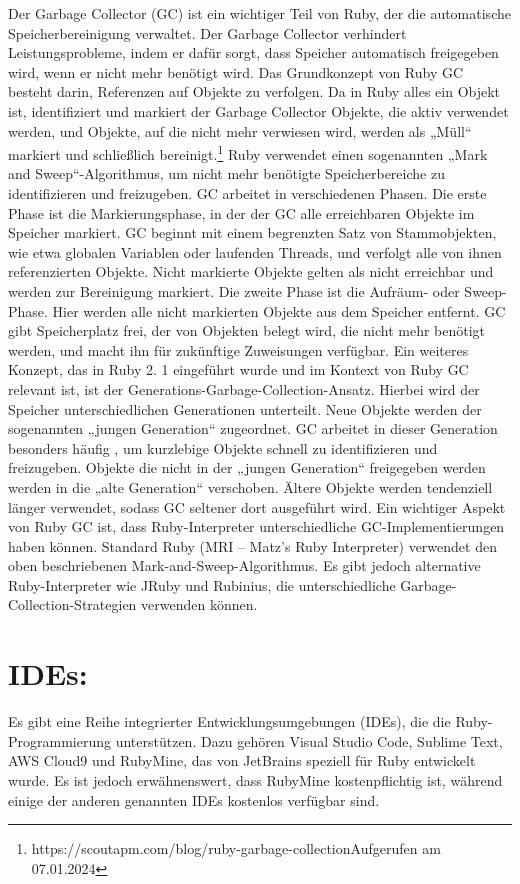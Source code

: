 \documentclass{article}
\begin{document}
Der Garbage Collector (GC) ist ein wichtiger Teil von Ruby, der die automatische Speicherbereinigung verwaltet.
Der Garbage Collector verhindert Leistungsprobleme, indem er dafür sorgt, dass Speicher automatisch freigegeben wird, wenn er nicht mehr benötigt wird.
Das Grundkonzept von Ruby GC besteht darin, Referenzen auf Objekte zu verfolgen.
Da in Ruby alles ein Objekt ist, identifiziert und markiert der Garbage Collector Objekte, die aktiv verwendet werden, und Objekte, auf die nicht mehr verwiesen wird, werden als „Müll“ markiert und schließlich bereinigt.\footnote{https://scoutapm.com/blog/ruby-garbage-collectionAufgerufen am 07.01.2024}
Ruby verwendet einen sogenannten „Mark and Sweep“-Algorithmus, um nicht mehr benötigte Speicherbereiche zu identifizieren und freizugeben.
GC arbeitet in verschiedenen Phasen.
Die erste Phase ist die Markierungsphase, in der der GC alle erreichbaren Objekte im Speicher markiert.
GC beginnt mit einem begrenzten Satz von Stammobjekten, wie etwa globalen Variablen oder laufenden Threads, und verfolgt alle von ihnen referenzierten Objekte.
Nicht markierte Objekte gelten als nicht erreichbar und werden zur Bereinigung markiert.
Die zweite Phase ist die Aufräum- oder Sweep-Phase.
Hier werden alle nicht markierten Objekte aus dem Speicher entfernt.
GC gibt Speicherplatz frei, der von Objekten belegt wird, die nicht mehr benötigt werden, und macht ihn für zukünftige Zuweisungen verfügbar.
Ein weiteres Konzept, das in Ruby 2.
1 eingeführt wurde und im Kontext von Ruby GC relevant ist, ist der Generations-Garbage-Collection-Ansatz.
Hierbei wird der Speicher unterschiedlichen Generationen unterteilt.
Neue Objekte werden der sogenannten „jungen Generation“ zugeordnet.
GC arbeitet in dieser Generation besonders häufig , um kurzlebige Objekte schnell zu identifizieren und freizugeben.
Objekte die nicht in der „jungen Generation“ freigegeben werden werden in die „alte Generation“ verschoben.
Ältere Objekte werden tendenziell länger verwendet, sodass GC seltener dort ausgeführt wird.
Ein wichtiger Aspekt von Ruby GC ist, dass Ruby-Interpreter unterschiedliche GC-Implementierungen haben können.
Standard Ruby (MRI – Matz's Ruby Interpreter) verwendet den oben beschriebenen Mark-and-Sweep-Algorithmus.
Es gibt jedoch alternative Ruby-Interpreter wie JRuby und Rubinius, die unterschiedliche Garbage-Collection-Strategien verwenden können.

\section*{IDEs:}
Es gibt eine Reihe integrierter Entwicklungsumgebungen (IDEs), die die Ruby-Programmierung unterstützen.
Dazu gehören Visual Studio Code, Sublime Text, AWS Cloud9 und RubyMine, das von JetBrains speziell für Ruby entwickelt wurde.
Es ist jedoch erwähnenswert, dass RubyMine kostenpflichtig ist, während einige der anderen genannten IDEs kostenlos verfügbar sind.
\end{document}
